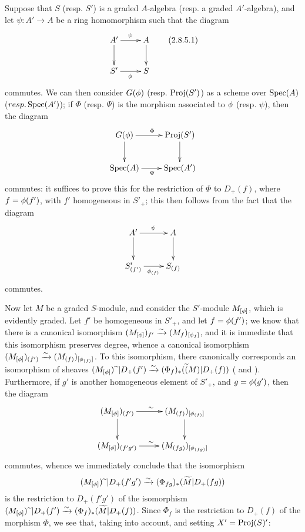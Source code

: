 \begin{env}[2.8.5]
\label{II.2.8.5}
Suppose that $S$ (resp. $S'$) is a graded $A$-algebra (resp. a graded $A'$-algebra), and let $\psi:A'\to A$ be a ring homomorphism such that the diagram
\[
\label{II.2.8.5.1}
  \xymatrix{
    A' \ar[r]^{\psi} \ar[d]
    & A \ar[d]
  \\S' \ar[r]_{\vphi}
    & S
  }
  \tag{2.8.5.1}
\]
commutes.
We can then consider $G(\phi)$ (resp. $\operatorname{Proj}(S')$) as a scheme over $\operatorname{Spec}(A)$ ($resp. \operatorname{Spec}(A')$);
if $\Phi$ (resp. $\Psi$) is the morphism associated to $\phi$ (resp. $\psi$), then the diagram
\[
  \xymatrix{
    G(\vphi) \ar[r]^{\Phi} \ar[d]
    & \Proj(S') \ar[d]
  \\\Spec(A) \ar[r]_{\Psi}
    & \Spec(A')
  }
\]
commutes: it suffices to prove this for the restriction of $\Phi$ to $D_+(f)$, where $f=\phi(f')$, with $f'$ homogeneous in $S'_+$;
this then follows from the fact that the diagram
\[
  \xymatrix{
    A' \ar[r]^{\psi} \ar[d]
    & A \ar[d]
  \\S'_{(f')} \ar[r]_{\vphi_{(f)}}
    & S_{(f)}
  }
\]
commutes.
\end{env}

\begin{env}[2.8.6]
\label{II.2.8.6}
Now let $M$ be a graded $S$-module, and consider the $S'$-module $M_{[\phi]}$, which is evidently graded.
Let $f'$ be homogeneous in $S'_+$, and let $f=\phi(f')$;
we know  that there is a canonical isomorphism $(M_{[\phi]})_{f'}\xrightarrow{\sim}(M_f)_{[\phi_f]}$, and it is immediate that this isomorphism preserves degree, whence a canonical isomorphism $(M_{[\phi]})_{(f')}\xrightarrow{\sim}(M_{(f)})_{[\phi_{(f)}]}$.
To this isomorphism, there canonically corresponds an isomorphism of sheaves $(M_{[\phi]}){\,\widetilde{\,}\,}|D_+(f')\xrightarrow{\sim}(\Phi_f)_*(\widetilde(M)|D_+(f))$ ( and ).
Furthermore,
if $g'$ is another homogeneous element of $S'_+$, and $g=\phi(g')$, then the diagram
\[
  \xymatrix{
    (M_{[\vphi]})_{(f')} \ar[r]^{\sim} \ar[d]
    & (M_{(f)})_{[\vphi_{(f)}]} \ar[d]
  \\(M_{[\vphi]})_{(f'g')} \ar[r]^{\sim}
    & (M_{(fg)})_{[\vphi_{(fg)}]}
  }
\]
commutes, whence we immediately conclude that the isomorphism
\[
  (M_{[\phi]}){\,\widetilde{\,}\,}|D_+(f'g') \xrightarrow{\sim} (\Phi_{fg})_*(\widetilde{M}|D_+(fg))
\]
is the restriction to $D_+(f'g')$ of the isomorphism $(M_{[\phi]}){\,\widetilde{\,}\,}|D_+(f')\xrightarrow{\sim}(\Phi_f)_*(\widetilde{M}|D_+(f))$.
Since $\Phi_f$ is the restriction to $D_+(f)$ of the morphism $\Phi$, we see that, taking  into account, and setting $X'=\operatorname{Proj}(S)'$:
\end{env}

